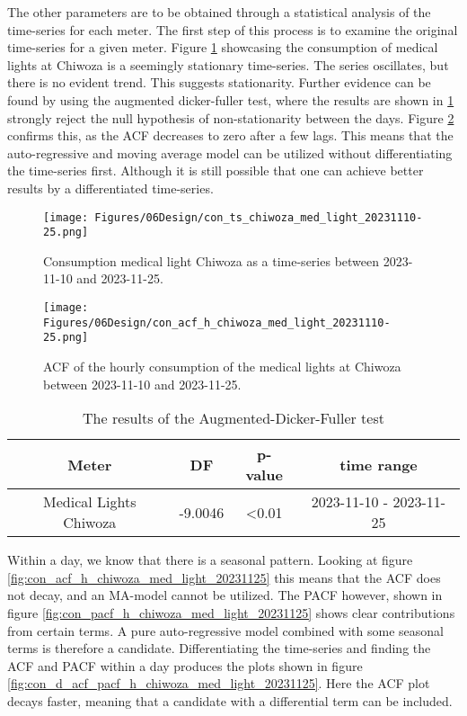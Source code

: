 The other parameters are to be obtained through a statistical analysis of the time-series for each meter. The first step of this process is to examine the original time-series for a given meter. Figure \ref{fig:con_ts_chiwoza_med_light_20231110-25} showcasing the consumption of medical lights at Chiwoza is a seemingly stationary time-series. The series oscillates, but there is no evident trend. This suggests stationarity. Further evidence can be found by using the augmented dicker-fuller test, where the results are shown in \ref{tab:result_dicker-fuller} strongly reject the null hypothesis of non-stationarity between the days. Figure \ref{fig:con_acf_h_chiwoza_med_light_20231110-25} confirms this, as the ACF decreases to zero after a few lags. This means that the auto-regressive and moving average model can be utilized without differentiating the time-series first. Although it is still possible that one can achieve better results by a differentiated time-series.\\


\begin{figure}[]
    \centering
    \texttt{[image: Figures/06Design/con\_ts\_chiwoza\_med\_light\_20231110-25.png]}
    \caption[Medical Light consumption Chiwoza 20231110-1125]{Consumption medical light Chiwoza as a time-series between 2023-11-10 and 2023-11-25.}
    \label{fig:con_ts_chiwoza_med_light_20231110-25}
\end{figure}

\begin{figure}[]
    \centering
    \texttt{[image: Figures/06Design/con\_acf\_h\_chiwoza\_med\_light\_20231110-25.png]}
    \caption[ACF Medical Light consumption Chiwoza 20231110-1125]{ACF of the hourly consumption of the medical lights at Chiwoza between 2023-11-10 and 2023-11-25.}
    \label{fig:con_acf_h_chiwoza_med_light_20231110-25}
\end{figure}


\begin{table}[]
    \centering
    \begin{tabular}{c|c|c|c}
    Meter & DF & p-value & time range \\
    \hline
    Medical Lights Chiwoza & -9.0046 & <0.01 & 2023-11-10 - 2023-11-25
    \end{tabular}
    \caption[Dicker-Fuller test]{The results of the Augmented-Dicker-Fuller test}
    \label{tab:result_dicker-fuller}
\end{table}

Within a day, we know that there is a seasonal pattern. Looking at figure \ref{fig:con_acf_h_chiwoza_med_light_20231125} this means that the ACF does not decay, and an MA-model cannot be utilized. The PACF however, shown in figure \ref{fig:con_pacf_h_chiwoza_med_light_20231125} shows clear contributions from certain terms. A pure auto-regressive model combined with some seasonal terms is therefore a candidate. Differentiating the time-series and finding the ACF and PACF within a day produces the plots shown in figure \ref{fig:con_d_acf_pacf_h_chiwoza_med_light_20231125}. Here the ACF plot decays faster, meaning that a candidate with a differential term can be included.\\

